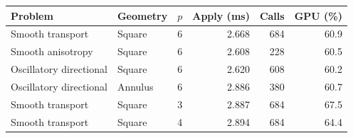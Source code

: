 \begin{tabular}{llrrrr}
\toprule
Problem & Geometry & $p$ & Apply (ms) & Calls & GPU (\%) \\
\midrule
Smooth transport & Square & 6 & 2.668 & 684 & 60.9 \\
Smooth anisotropy & Square & 6 & 2.608 & 228 & 60.5 \\
Oscillatory directional & Square & 6 & 2.620 & 608 & 60.2 \\
Oscillatory directional & Annulus & 6 & 2.886 & 380 & 60.7 \\
Smooth transport & Square & 3 & 2.887 & 684 & 67.5 \\
Smooth transport & Square & 4 & 2.894 & 684 & 64.4 \\
\bottomrule
\end{tabular}
